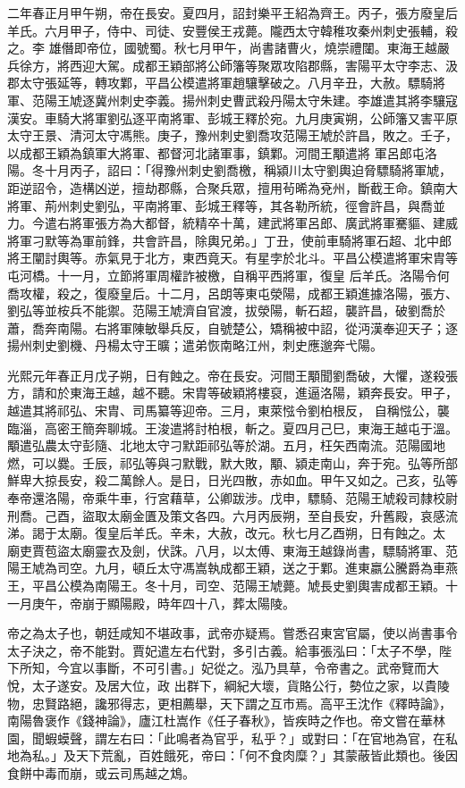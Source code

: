 \begin{pinyinscope}
 二年春正月甲午朔，帝在長安。夏四月，詔封樂平王紹為齊王。丙子，張方廢皇后羊氏。六月甲子，侍中、司徒、安豐侯王戎薨。隴西太守韓稚攻秦州刺史張輔，殺之。李
 雄僭即帝位，國號蜀。秋七月甲午，尚書諸曹火，燒崇禮闥。東海王越嚴兵徐方，將西迎大駕。成都王穎部將公師籓等聚眾攻陷郡縣，害陽平太守李志、汲郡太守張延等，轉攻鄴，平昌公模遣將軍趙驤擊破之。八月辛丑，大赦。驃騎將軍、范陽王虓逐冀州刺史李義。揚州刺史曹武殺丹陽太守朱建。李雄遣其將李驤寇漢安。車騎大將軍劉弘逐平南將軍、彭城王釋於宛。九月庚寅朔，公師籓又害平原太守王景、清河太守馮熊。庚子，豫州刺史劉喬攻范陽王虓於許昌，敗之。壬子，以成都王穎為鎮軍大將軍、都督河北諸軍事，鎮鄴。河間王顒遣將
 軍呂郎屯洛陽。冬十月丙子，詔曰：「得豫州刺史劉喬檄，稱潁川太守劉輿迫脅驃騎將軍虓，距逆詔令，造構凶逆，擅劫郡縣，合聚兵眾，擅用茍晞為兗州，斷截王命。鎮南大將軍、荊州刺史劉弘，平南將軍、彭城王釋等，其各勒所統，徑會許昌，與喬並力。今遣右將軍張方為大都督，統精卒十萬，建武將軍呂郎、廣武將軍騫貙、建威將軍刁默等為軍前鋒，共會許昌，除輿兄弟。」丁丑，使前車騎將軍石超、北中郎將王闡討輿等。赤氣見于北方，東西竟天。有星孛於北斗。平昌公模遣將軍宋胄等屯河橋。十一月，立節將軍周權詐被檄，自稱平西將軍，復皇
 后羊氏。洛陽令何喬攻權，殺之，復廢皇后。十二月，呂朗等東屯滎陽，成都王穎進據洛陽，張方、劉弘等並桉兵不能禦。范陽王虓濟自官渡，拔滎陽，斬石超，襲許昌，破劉喬於蕭，喬奔南陽。右將軍陳敏舉兵反，自號楚公，矯稱被中詔，從沔漢奉迎天子；逐揚州刺史劉機、丹楊太守王曠；遣弟恢南略江州，刺史應邈奔弋陽。



 光熙元年春正月戊子朔，日有蝕之。帝在長安。河間王顒聞劉喬破，大懼，遂殺張方，請和於東海王越，越不聽。宋胄等破穎將樓裒，進逼洛陽，穎奔長安。甲子，越遣其將祁弘、宋胄、司馬纂等迎帝。三月，東萊惤令劉柏根反，
 自稱惤公，襲臨淄，高密王簡奔聊城。王浚遣將討柏根，斬之。夏四月己巳，東海王越屯于溫。顒遣弘農太守彭隨、北地太守刁默距祁弘等於湖。五月，枉矢西南流。范陽國地燃，可以爨。壬辰，祁弘等與刁默戰，默大敗，顒、潁走南山，奔于宛。弘等所部鮮卑大掠長安，殺二萬餘人。是日，日光四散，赤如血。甲午又如之。己亥，弘等奉帝還洛陽，帝乘牛車，行宮藉草，公卿跋涉。戊申，驃騎、范陽王虓殺司隸校尉刑喬。己酉，盜取太廟金匱及策文各四。六月丙辰朔，至自長安，升舊殿，哀感流涕。謁于太廟。復皇后羊氏。辛未，大赦，改元。秋七月乙酉朔，日有蝕之。太
 廟吏賈苞盜太廟靈衣及劍，伏誅。八月，以太傅、東海王越錄尚書，驃騎將軍、范陽王虓為司空。九月，頓丘太守馮嵩執成都王穎，送之于鄴。進東嬴公騰爵為車燕王，平昌公模為南陽王。冬十月，司空、范陽王虓薨。虓長史劉輿害成都王穎。十一月庚午，帝崩于顯陽殿，時年四十八，葬太陽陵。



 帝之為太子也，朝廷咸知不堪政事，武帝亦疑焉。嘗悉召東宮官屬，使以尚書事令太子決之，帝不能對。賈妃遣左右代對，多引古義。給事張泓曰：「太子不學，陛下所知，今宜以事斷，不可引書。」妃從之。泓乃具草，令帝書之。武帝覽而大悅，太子遂安。及居大位，政
 出群下，綱紀大壞，貨賂公行，勢位之家，以貴陵物，忠賢路絕，讒邪得志，更相薦舉，天下謂之互市焉。高平王沈作《釋時論》，南陽魯褒作《錢神論》，廬江杜嵩作《任子春秋》，皆疾時之作也。帝文嘗在華林園，聞蝦蟆聲，謂左右曰：「此鳴者為官乎，私乎？」或對曰：「在官地為官，在私地為私。」及天下荒亂，百姓餓死，帝曰：「何不食肉糜？」其蒙蔽皆此類也。後因食餅中毒而崩，或云司馬越之鴆。




\end{pinyinscope}
